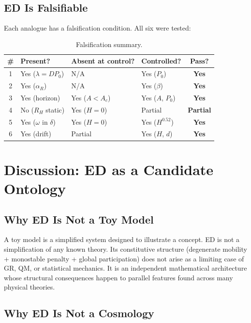 \documentclass[11pt]{article}
\begin{document}
\subsection{ED Is Falsifiable}

Each analogue has a falsification condition. All six were tested:

\begin{table}[h]
\centering
\begin{tabular}{@{}clllc@{}}
\toprule
\# & Present? & Absent at control? & Controlled? & Pass? \\
\midrule
1 & Yes (\(\lambda = DP_0\)) & N/A & Yes (\(P_0\)) & \textbf{Yes} \\
2 & Yes (\(\alpha_R\)) & N/A & Yes (\(\beta\)) & \textbf{Yes} \\
3 & Yes (horizon) & Yes (\(A < A_c\)) & Yes (\(A\), \(P_0\)) & \textbf{Yes} \\
4 & No (\(R_H\) static) & Yes (\(H=0\)) & Partial & \textbf{Partial} \\
5 & Yes (\(\omega\) in \(\delta\)) & Yes (\(H=0\)) & Yes (\(H^{0.52}\)) & \textbf{Yes} \\
6 & Yes (drift) & Partial & Yes (\(H\), \(d\)) & \textbf{Yes} \\
\bottomrule
\end{tabular}
\caption{Falsification summary.}
\label{tab:falsification}
\end{table}

\section{Discussion: ED as a Candidate Ontology}

\subsection{Why ED Is Not a Toy Model}

A toy model is a simplified system designed to illustrate a concept. ED is not a simplification of any known theory. Its constitutive structure (degenerate mobility + monostable penalty + global participation) does not arise as a limiting case of GR, QM, or statistical mechanics. It is an independent mathematical architecture whose structural consequences happen to parallel features found across many physical theories.

\subsection{Why ED Is Not a Cosmology}
\end{document}
